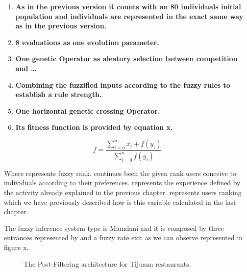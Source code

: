 \begin{enumerate}
	\item  \textbf{As in the previous version it counts with an 80 individuals initial population and individuals are represented in the exact same way as in the previous version.
	}
	
	\item  \textbf{8 evaluations as one evolution parameter.}
	
	\item  \textbf{One genetic Operator as aleatory selection between competition and … } 
	\item  \textbf{Combining the fuzzified inputs according to the fuzzy rules to establish a rule strength.} 
	\item  \textbf{One horizontal genetic crossing Operator.}
	\item  \textbf{Its fitness function is provided by equation x.}
\end{enumerate}

\begin{equation}\label{eq:fitfunc03}
\displaystyle f=\frac{\sum_{i=0}^{n}x_{i}+f(y_{i})}{\sum_{i=0}^{n}f(y_{i})}
\end{equation}

Where  represents fuzzy rank.
continues been the given rank users conceive to individuals according to their preferences.
represents the experience defined by the activity already explained in the previous chapter.
represents users ranking which we have previously described how is this variable calculated in the last chapter.

The fuzzy inference system type is Mamdani and it is composed by three entrances represented by  and a fuzzy rate exit as we can observe represented in figure x.

\begin{figure}
	\centering
	\setlength\fboxsep{0pt}
	\caption{The Post-Filtering architecture for Tijuana restaurants.}
	\label{fig:postfiltering}     
\end{figure}

